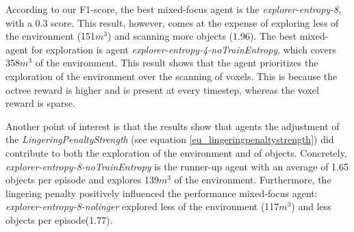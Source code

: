         According to our F1-score, the best mixed-focus agent is the \textit{explorer-entropy-8}, with a 0.3 score. This result, however, comes at the expense of exploring less of the environment (151$m^3$) and scanning more objects (1.96). The best mixed-agent for exploration is agent \textit{explorer-entropy-4-noTrainEntropy}, which covers 358$m^3$ of the environment. This result shows that the agent prioritizes the exploration of the environment over the scanning of voxels. This is because the octree reward is higher and is present at every timestep, whereas the voxel reward is sparse.
        
        Another point of interest is that the results show that agents the adjustment of the \textit{LingeringPenaltyStrength} (see equation \ref{eu_lingeringpenaltystrength}) did contribute to both the exploration of the environment and of objects. Concretely, \textit{explorer-entropy-8-noTrainEntropy} is the runner-up agent with an average of 1.65 objects per episode and explores 139$m^3$ of the environment. 
        Furthermore, the lingering penalty positively influenced the performance mixed-focus agent: \textit{explorer-entropy-8-nolinger} explored less of the environment (117$m^3$) and less objects per episode(1.77).
    
        
